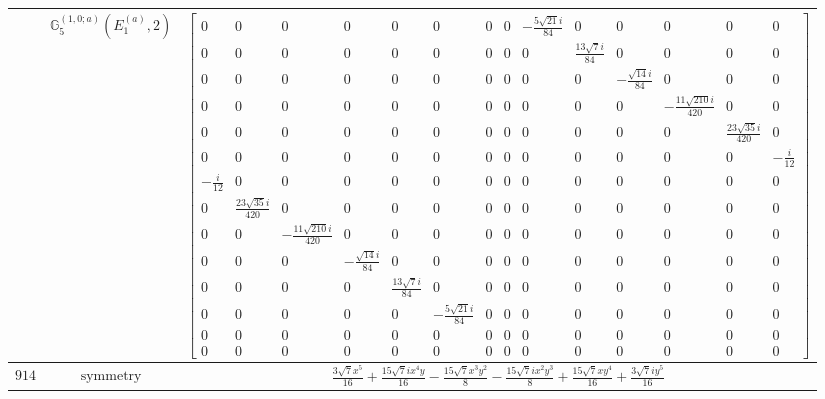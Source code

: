 \documentclass[fleqn,8pt,landscape]{jsarticle}
\begin{document}
\begin{longtable}{ccc}
$  $ & $ \mathbb{G}_{5}^{(1,0;a)}(E_{1}^{(a)},2) $ & $ \begin{bmatrix} 0 & 0 & 0 & 0 & 0 & 0 & 0 & 0 & - \frac{5 \sqrt{21} i}{84} & 0 & 0 & 0 & 0 & 0 \\ 0 & 0 & 0 & 0 & 0 & 0 & 0 & 0 & 0 & \frac{13 \sqrt{7} i}{84} & 0 & 0 & 0 & 0 \\ 0 & 0 & 0 & 0 & 0 & 0 & 0 & 0 & 0 & 0 & - \frac{\sqrt{14} i}{84} & 0 & 0 & 0 \\ 0 & 0 & 0 & 0 & 0 & 0 & 0 & 0 & 0 & 0 & 0 & - \frac{11 \sqrt{210} i}{420} & 0 & 0 \\ 0 & 0 & 0 & 0 & 0 & 0 & 0 & 0 & 0 & 0 & 0 & 0 & \frac{23 \sqrt{35} i}{420} & 0 \\ 0 & 0 & 0 & 0 & 0 & 0 & 0 & 0 & 0 & 0 & 0 & 0 & 0 & - \frac{i}{12} \\ - \frac{i}{12} & 0 & 0 & 0 & 0 & 0 & 0 & 0 & 0 & 0 & 0 & 0 & 0 & 0 \\ 0 & \frac{23 \sqrt{35} i}{420} & 0 & 0 & 0 & 0 & 0 & 0 & 0 & 0 & 0 & 0 & 0 & 0 \\ 0 & 0 & - \frac{11 \sqrt{210} i}{420} & 0 & 0 & 0 & 0 & 0 & 0 & 0 & 0 & 0 & 0 & 0 \\ 0 & 0 & 0 & - \frac{\sqrt{14} i}{84} & 0 & 0 & 0 & 0 & 0 & 0 & 0 & 0 & 0 & 0 \\ 0 & 0 & 0 & 0 & \frac{13 \sqrt{7} i}{84} & 0 & 0 & 0 & 0 & 0 & 0 & 0 & 0 & 0 \\ 0 & 0 & 0 & 0 & 0 & - \frac{5 \sqrt{21} i}{84} & 0 & 0 & 0 & 0 & 0 & 0 & 0 & 0 \\ 0 & 0 & 0 & 0 & 0 & 0 & 0 & 0 & 0 & 0 & 0 & 0 & 0 & 0 \\ 0 & 0 & 0 & 0 & 0 & 0 & 0 & 0 & 0 & 0 & 0 & 0 & 0 & 0 \end{bmatrix} $ \\ \hline
$ 914 $ & $ \text{symmetry} $ & $ \frac{3 \sqrt{7} x^{5}}{16} + \frac{15 \sqrt{7} i x^{4} y}{16} - \frac{15 \sqrt{7} x^{3} y^{2}}{8} - \frac{15 \sqrt{7} i x^{2} y^{3}}{8} + \frac{15 \sqrt{7} x y^{4}}{16} + \frac{3 \sqrt{7} i y^{5}}{16} $ \\

\end{longtable}
\end{document}
